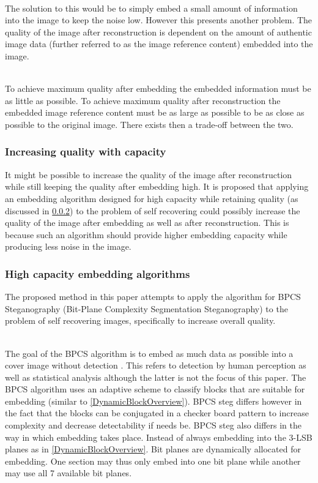 \documentclass[12pt]{article}
\begin{document}
\hspace{0pt} \\
The solution to this would be to simply embed a small amount of information into the image to keep the noise low.
However this presents another problem.
The quality of the image after reconstruction is dependent on the amount of authentic image data (further referred to as the image reference content) embedded into the image.

\hspace{0pt} \\
To achieve maximum quality after embedding the embedded information must be as little as possible.
To achieve maximum quality after reconstruction the embedded image reference content must be as large as possible to be as close as possible to the original image.
There exists then a trade-off between the two.

\subsubsection{Increasing quality with capacity}
\label{introQualityIncrease}
It might be possible to increase the quality of the image after reconstruction while still keeping the quality after embedding high.
It is proposed that applying an embedding algorithm designed for high capacity while retaining quality (as discussed in \ref{introHighCap}) to the problem of self recovering could possibly increase the quality of the image after embedding as well as after reconstruction.
This is because such an algorithm should provide higher embedding capacity while producing less noise in the image. 

\subsubsection{High capacity embedding algorithms}
\label{introHighCap}
The proposed method in this paper attempts to apply the algorithm for BPCS Steganography (Bit-Plane Complexity Segmentation Steganography) \cite{beaullieubpcs} to the problem of self recovering images, specifically to increase overall quality.

\hspace{0pt} \\
The goal of the BPCS algorithm is to embed as much data as possible into a cover image without detection \cite{beaullieubpcs}.
This refers to detection by human perception as well as statistical analysis although the latter is not the focus of this paper.
The BPCS algorithm uses an adaptive scheme to classify blocks that are suitable for embedding (similar to \ref{DynamicBlockOverview}).
BPCS steg differs however in the fact that the blocks can be conjugated in a checker board pattern to increase complexity and decrease detectability if needs be.
BPCS steg also differs in the way in which embedding takes place.
Instead of always embedding into the 3-LSB planes as in \ref{DynamicBlockOverview}.
Bit planes are dynamically allocated for embedding.
One section may thus only embed into one bit plane while another may use all 7 available bit planes.
\end{document}
